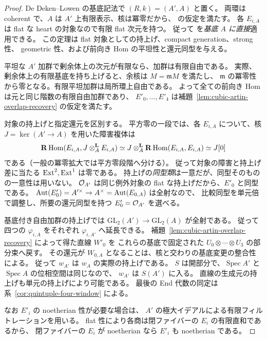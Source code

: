 \begin{proof}
De Deken--Lowen の基底記法で $(R,k)=(A',A)$ と置く。
両環は coherent で、$A$ は $A'$ 上有限表示、核は冪零だから、
\cite[\S4.1]{DeDekenLowen2011} の仮定を満たす。
各 $E_{i,A}$ は flat な heart の対象なので有限 flat 次元を持つ。
従って \cite[Theorem 5.13(1)--(4)]{DeDekenLowen2011} を\emph{基底 $A$ に直接}適用できる。
この定理は flat 対象としての持上げ、compact generation、strong 性、
geometric 性、および前向き Hom の平坦性と還元同型を与える。

平坦な $A'$ 加群で剰余体上の次元が有限なら、加群は有限自由である。
実際、剰余体上の有限基底を持ち上げると、余核は $M=\mathfrak mM$ を満たし、
$\mathfrak m$ の冪零性から零となる。有限平坦加群は局所環上自由である。
よって全ての前向き Hom は元と同じ階数の有限自由加群であり、
$E'_0,\ldots,E'_4$ は補題~\ref{lem:cubic-artin-overlap-recovery} の仮定を満たす。

対象の持上げと指定還元を区別する。
平方零の一段では、各 $E_{i,A}$ について、核 $J=\ker(A'\to A)$ を用いた障害複体は
\[
 \mathbf R\operatorname{Hom}(E_{i,A},J\otimes_A^{\mathbf L}E_{i,A})
 \simeq J\otimes_A^{\mathbf L}\mathbf R\operatorname{Hom}(E_{i,A},E_{i,A})
 \simeq J[0]
\]
である（一般の冪零拡大では平方零段階へ分ける）。
従って対象の障害と持上げ差に当たる $\operatorname{Ext}^2,\operatorname{Ext}^1$ は零である。
持上げの\emph{同型類}は一意だが、同型そのものの一意性は用いない。
$\mathcal O_{A'}$ は同じ例外対象の flat な持上げだから、$E'_0$ と同型である。
$\operatorname{Aut}(E'_0)=A'^\times\to A^\times=\operatorname{Aut}(E_{0,A})$ は全射なので、
比較同型を単元倍で調整し、所要の還元同型を持つ $E'_0=\mathcal O_{A'}$ を選べる。

基底付き自由加群の持上げでは
$\mathrm{GL}_2(A')\to\mathrm{GL}_2(A)$ が全射である。
従って四つの $\varphi_{i,A}$ をそれぞれ $\varphi_{i,A'}$ へ延長できる。
補題~\ref{lem:cubic-artin-overlap-recovery} によって得た直線 $W'_{0}$ を
これらの基底で固定された $U_0\otimes\cdots\otimes U_3$ の部分束へ戻す。
その還元が $W_{0,A}$ となることは、核と交わりの基底変更の整合性による。
従って $w_{A'}$ は $w_A$ の実際の持上げである。
$S$ は開部分で、$\operatorname{Spec} A'$ と $\operatorname{Spec} A$ の位相空間は同じなので、
$w_{A'}$ は $S(A')$ に入る。
直線の生成元の持上げも単元の持上げにより可能である。
最後の End 代数の同定は系~\ref{cor:quintuple-four-window} による。

なお $E'_i$ の noetherian 性が必要な場合は、
$A'$ の極大イデアルによる有限フィルトレーションを用いる。
flat 性により各商は閉ファイバーの $E_i$ の有限直和であるから、
閉ファイバーの $E_i$ が noetherian なら $E'_i$ も noetherian である。
\end{proof}

